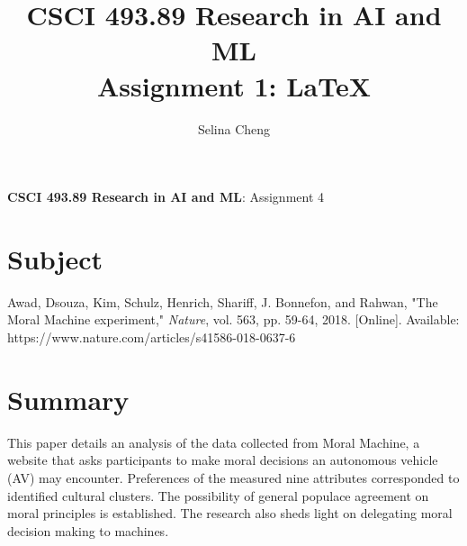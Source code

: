 \documentclass[12pt, letterpaper]{article}
\title{\textbf{CSCI 493.89 Research in AI and ML\\Assignment 1: \LaTeX{}}} %
\author{Selina Cheng} %
\affiliation{CUNY Hunter College} %
\begin{document}
\pagestyle{empty}
\singlespacing


    



\vspace{1.0cm}





\newgeometry{} %

\textbf{CSCI 493.89 Research in AI and ML}: Assignment 4

\section{Subject}
\label{sec:subject}
Awad, Dsouza, Kim, Schulz, Henrich, Shariff, J. Bonnefon, and Rahwan, "The Moral Machine experiment," \emph{Nature}, vol. 563, pp. 59-64, 2018. [Online]. Available: https://www.nature.com/articles/s41586-018-0637-6


\section{Summary}
\label{sec:summary}
This paper details an analysis of the data collected from Moral Machine, a website that asks participants to make moral decisions an autonomous vehicle (AV) may encounter. Preferences of the measured nine attributes corresponded to identified cultural clusters. The possibility of general populace agreement on moral principles is established. The research also sheds light on delegating moral decision making to machines.
\end{document}
